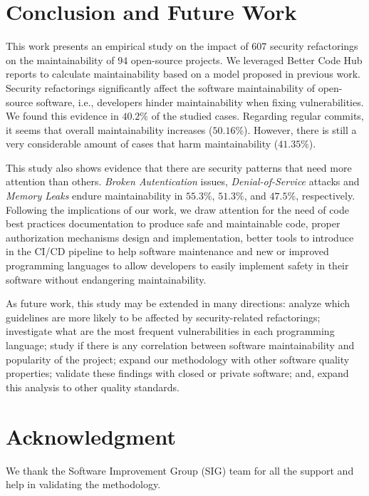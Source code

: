 \documentclass[10pt,conference]{IEEEtran}
\newcommand\Sof[1]{\nb{Sofia}{red}{#1}}
\begin{document}
\section{Conclusion and Future Work}\label{sec:conclusions}

This work presents an empirical study on the impact of $607$ security
refactorings on the maintainability of $94$ open-source projects. We leveraged
Better Code Hub reports to calculate maintainability
based on a model proposed in previous work. Security refactorings significantly
affect the software maintainability of open-source software, i.e., developers
hinder maintainability when fixing vulnerabilities. We found this evidence in
$40.2\%$ of the studied cases. Regarding regular commits, it seems that overall
maintainability increases ($50.16\%$). However, there is still a very
considerable amount of cases that harm maintainability ($41.35\%$).

This study also shows evidence that there are security patterns that need more attention than
others. \emph{Broken Autentication} issues, \emph{Denial-of-Service} attacks and
\emph{Memory Leaks} endure maintainability in $55.3\%$, $51.3\%$, and $47.5\%$,
respectively. \Sof{Check this par again}Following the implications of our work, we draw attention for the
need of code best practices documentation to
produce safe and maintainable code, proper authorization mechanisms design and
implementation, better tools to introduce in the CI/CD pipeline to help software
maintenance and new or improved programming languages to allow developers to
easily implement safety in their software without endangering maintainability.

As future work, this study may be extended in many directions: analyze which
guidelines are more likely to be affected by security-related refactorings;
investigate what are the most frequent vulnerabilities in each programming language; study if there is any correlation between software
maintainability and popularity of the project; expand our methodology with other
software quality properties; validate these findings with closed or private
software; and, expand this analysis to other quality standards.

\section*{Acknowledgment}\label{sec:ack}

\noindent
We thank the Software Improvement Group (SIG) team for all the support and
help in validating the methodology.

\balance

{
 
  
}
\end{document}
